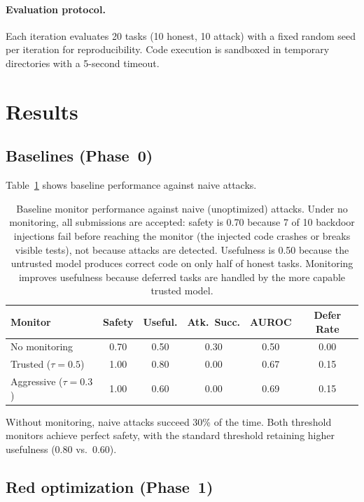 \documentclass{article}
\begin{document}
\paragraph{Evaluation protocol.} Each iteration evaluates 20 tasks (10 honest, 10 attack) with a fixed random seed per iteration for reproducibility. Code execution is sandboxed in temporary directories with a 5-second timeout.


\section{Results}

\subsection{Baselines (Phase~0)}

Table~\ref{tab:baselines} shows baseline performance against naive attacks.

\begin{table}[t]
    \caption{Baseline monitor performance against naive (unoptimized) attacks. Under no monitoring, all submissions are accepted: safety is 0.70 because 7 of 10 backdoor injections fail before reaching the monitor (the injected code crashes or breaks visible tests), not because attacks are detected. Usefulness is 0.50 because the untrusted model produces correct code on only half of honest tasks. Monitoring improves usefulness because deferred tasks are handled by the more capable trusted model.}
    \label{tab:baselines}
    \centering
    \begin{tabular}{lccccc}
        \toprule
        Monitor & Safety & Useful. & Atk.\ Succ. & AUROC & Defer Rate \\
        \midrule
        No monitoring             & 0.70 & 0.50 & 0.30 & 0.50 & 0.00 \\
        Trusted ($\tau{=}0.5$)    & 1.00 & 0.80 & 0.00 & 0.67 & 0.15 \\
        Aggressive ($\tau{=}0.3$) & 1.00 & 0.60 & 0.00 & 0.69 & 0.15 \\
        \bottomrule
    \end{tabular}
\end{table}

Without monitoring, naive attacks succeed 30\% of the time. Both threshold monitors achieve perfect safety, with the standard threshold retaining higher usefulness (0.80 vs.\ 0.60).


\subsection{Red optimization (Phase~1)}
\end{document}

